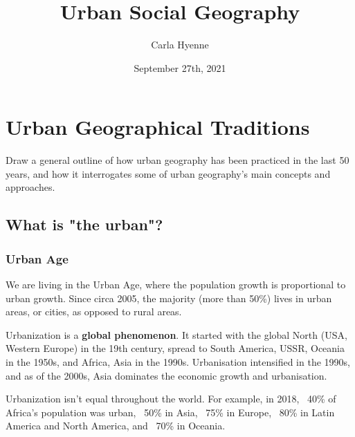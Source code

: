 \documentclass{article}
\title{Urban Social Geography}
\author{Carla Hyenne }
\begin{document}
\maketitle

\tableofcontents


\pagebreak\section{Urban Geographical Traditions}
\date{September 27th, 2021}

Draw a general outline of how urban geography has been practiced in the last 50 years, and how it interrogates some of urban geography's main concepts and approaches.

\subsection{What is "the urban"?}

\subsubsection{Urban Age}

We are living in the Urban Age, where the population growth is proportional to urban growth. Since circa 2005, the majority (more than 50\%) lives in urban areas, or cities, as opposed to rural areas.

Urbanization is a \textbf{global phenomenon}. It started with the global North (USA, Western Europe) in the 19th century, spread to South America, USSR, Oceania in the 1950s, and Africa, Asia in the 1990s. Urbanisation intensified in the 1990s, and as of the 2000s, Asia dominates the economic growth and urbanisation.

Urbanization isn't equal throughout the world. For example, in 2018, ~40\% of Africa's population was urban, ~50\% in Asia, ~75\% in Europe, ~80\% in Latin America and North America, and ~70\% in Oceania.
\end{document}
